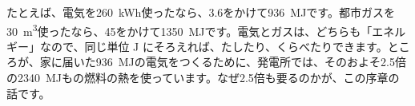\noindent たとえば、電気を\qty{260}{kWh}使ったなら、3.6をかけて\qty{936}{MJ}です。都市ガスを\qty{30}{m^3}使ったなら、45をかけて\qty{1350}{MJ}です。電気とガスは、どちらも「エネルギー」なので、同じ単位 J にそろえれば、たしたり、くらべたりできます。ところが、家に届いた\qty{936}{MJ}の電気をつくるために、発電所では、そのおよそ2.5倍の\qty{2340}{MJ}もの燃料の熱を使っています。なぜ2.5倍も要るのかが、この序章の話です。

\begin{omoidasou}
\end{omoidasou}


